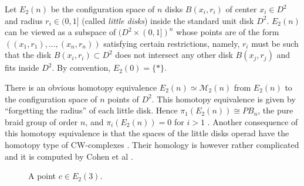 \documentclass[TFM.tex]{subfiles}
\begin{document}
 
 Let $E_2(n)$ be the configuration space of $n$ disks $B(x_i,r_i)$ of center $x_i\in D^2$ and radius $r_i\in (0,1]$ (called \emph{little disks}) inside the standard unit disk $D^2$. $E_2(n)$ can be viewed as a subspace of $(D^2\times (0,1])^n$ whose points are of the form $((x_1,r_1),\dots, (x_n,r_n))$ satisfying certain restrictions, namely, $r_i$ must be such that the disk $B(x_i,r_i)\subset D^2$ does not intersect any other disk $B(x_j,r_j)$ and fits inside $D^2$. By convention, $E_2(0)=\{*\}$.  
 
 There is an obvious homotopy equivalence $E_2(n)\simeq \mathcal{M}_2(n)$ from $E_2(n)$ to the configuration space of $n$ points of $D^2$. This homotopy equivalence is given by ``forgetting the radius'' of each little disk. %
   Hence $\pi_1(E_2(n))\cong PB_n$, the pure braid group of order $n$, and $\pi_i(E_2(n))=0$ for $i>1$ \cite{fox}. Another consequence of this homotopy equivalence is that the spaces of the little disks operad have the homotopy type of CW-complexes \cite{CW}. Their homology is however rather complicated and it is computed by Cohen et al \cite{cuentas}.  
 
 

\begin{figure}[h!]
\caption{A point $c\in E_2(3)$.}
 \end{figure}
 
\end{document}
